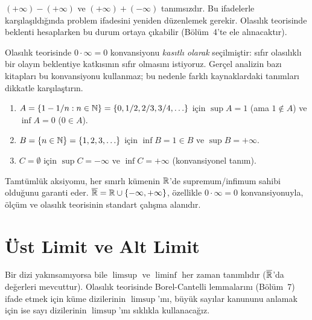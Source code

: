 \begin{uyari}
$(+\infty) - (+\infty)$ ve $(+\infty) + (-\infty)$ tanımsızdır.
Bu ifadelerle karşılaşıldığında problem ifadesini yeniden düzenlemek gerekir.
Olasılık teorisinde beklenti hesaplarken bu durum ortaya çıkabilir
(Bölüm~4'te ele alınacaktır).
\end{uyari}

\begin{hataanalizi}[$0 \cdot \infty = 0$ konvansiyonunun önemi]
Olasılık teorisinde $0 \cdot \infty = 0$ konvansiyonu \emph{kasıtlı olarak}
seçilmiştir: sıfır olasılıklı bir olayın beklentiye katkısının sıfır olmasını
istiyoruz. Gerçel analizin bazı kitapları bu konvansiyonu kullanmaz; bu nedenle
farklı kaynaklardaki tanımları dikkatle karşılaştırın.
\end{hataanalizi}

\begin{ornek}
\begin{enumerate}[label=(\alph*)]
  \item $A = \{1 - 1/n : n \in \mathbb{N}\} = \{0, 1/2, 2/3, 3/4, \ldots\}$
        için $\sup A = 1$ (ama $1 \notin A$) ve $\inf A = 0$ ($0 \in A$).
  \item $B = \{n \in \mathbb{N}\} = \{1,2,3,\ldots\}$ için $\inf B = 1 \in B$ ve
        $\sup B = +\infty$.
  \item $C = \emptyset$ için $\sup C = -\infty$ ve $\inf C = +\infty$
        (konvansiyonel tanım).
\end{enumerate}
\end{ornek}

\begin{mikroozet}[§0.4 özeti]
Tamtümlük aksiyomu, her sınırlı kümenin $\mathbb{R}$'de supremum/infimum
sahibi olduğunu garanti eder.
$\overline{\mathbb{R}} = \mathbb{R} \cup \{-\infty, +\infty\}$,
özellikle $0 \cdot \infty = 0$ konvansiyonuyla, ölçüm ve olasılık teorisinin
standart çalışma alanıdır.
\end{mikroozet}


\section{Üst Limit ve Alt Limit}

\begin{motivasyon}[§0.5]
Bir dizi yakınsamıyorsa bile $\limsup$ ve $\liminf$ her zaman tanımlıdır
($\overline{\mathbb{R}}$'da değerleri mevcuttur). Olasılık teorisinde Borel-Cantelli
lemmalarını (Bölüm~7) ifade etmek için küme dizilerinin $\limsup$'ını,
büyük sayılar kanununu anlamak için ise sayı dizilerinin $\limsup$'ını
sıklıkla kullanacağız.
\end{motivasyon}

